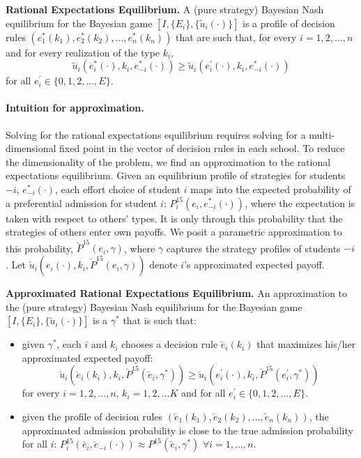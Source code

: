 \begin{definition}\label{RE_def} {\bf Rational Expectations Equilibrium.} A (pure strategy) Bayesian Nash equilibrium for the Bayesian game $[I,\{E_i\},\{\tilde{u}_i(\cdot)\}]$ is a profile of decision rules $(e^*_1(k_1),e^*_2(k_2),..., e^*_n(k_n))$ that are such that, for every $i=1,2,...,n$ and for every realization of the type $k_i$,
	$$\tilde{u}_i(e^*_i(\cdot),k_i,e^*_{-i}(\cdot))\geq \tilde{u}_i(e^{'}_i(\cdot),k_i,e^*_{-i}(\cdot))$$
	\noindent for all $e^{'}_i\in \{0,1,2,...,E\}$.
	
	
\end{definition}

\paragraph{Intuition for approximation.} Solving for the rational expectations equilibrium requires solving for a multi-dimensional fixed point in the vector of decision rules in each school. To reduce the dimensionality of the problem, we find an approximation to the rational expectations equilibrium. Given an equilibrium profile of strategies for students $-i$, $e^{*}_{-i}(\cdot)$, each effort choice of student $i$ maps into the expected probability of a preferential admission for student $i$: $P_i^{15}(e_i,e^{*}_{-i}(\cdot))$, where the expectation is taken with respect to others' types. It is only through this probability that the strategies of others enter own payoffs. We posit a parametric approximation to this probability, $\check{P}^{15}(e_i,\gamma)$, where $\gamma$ captures the strategy profiles of students $-i$. Let $\check{u}_i(e_i(\cdot),k_i,\check{P}^{15}(e_i,\gamma))$ denote $i$'s approximated expected payoff.\par 

\begin{definition}\label{Approximated_RE_def} {\bf Approximated Rational Expectations Equilibrium. } An approximation to the (pure strategy) Bayesian Nash equilibrium for the Bayesian game $[I,\{E_i\},\{\tilde{u}_i(\cdot)\}]$ is a $\gamma^*$ that is such that:
	\begin{itemize}[leftmargin=5.5mm]\setlength\itemsep{0.0em}
		\item given $\gamma^*$, each $i$ and $k_i$ chooses a decision rule $\check{e}_i(k_i)$ that maximizes his/her approximated expected payoff:
		$$\check{u}_i(\check{e}_i(k_i),k_i,\check{P}^{15}(\check{e}_i,\gamma^*))\geq \check{u}_i(e^{'}_i(\cdot),k_i,\check{P}^{15}(e^{'}_i,\gamma^*))$$  \noindent for every $i=1,2,...,n$, $k_i=1,2,...K$ and for all $e^{'}_i\in \{0,1,2,...,E\}$.
		\item given the profile of decision rules $(\check{e}_1(k_1),\check{e}_2(k_2),..., \check{e}_n(k_n))$, the approximated admission probability is close to the true admission probability for all $i$: $P_i^{15}(\check{e_i},\check{e}_{-i}(\cdot))\approx P^{15}(\check{e}_i,\gamma^*)$ $\forall i=1,...,n$.
	\end{itemize}
\end{definition}


